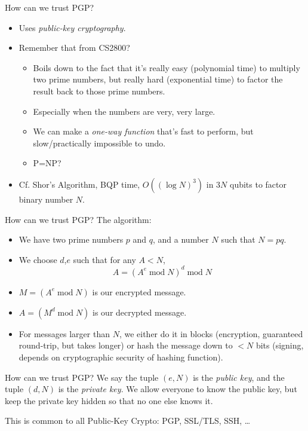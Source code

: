 \documentclass{beamer}
\begin{document}
\begin{frame}{How can we trust PGP?}
  \begin{itemize}
    \item Uses \textit{public-key cryptography}.
    \item Remember that from CS2800?
      \begin{itemize}
      \item Boils down to the fact that it's really easy (polynomial
        time) to multiply two prime numbers, but really hard
        (exponential time) to factor the result back to those prime
        numbers.
      \item Especially when the numbers are very, very large.
      \item We can make a \textit{one-way function} that's fast to
        perform, but slow/practically impossible to undo.
      \item P=NP?
      \end{itemize}
    \item Cf. Shor's Algorithm, BQP time, $O\left((\log N)^3\right)$
      in $3N$ qubits to factor binary number $N$.
  \end{itemize}
\end{frame}

\begin{frame}{How can we trust PGP?}
  The algorithm:
  \begin{itemize}
  \item We have two prime numbers $p$ and $q$, and a number $N$ such
    that $N=pq$.
  \item We choose $d$,$e$ such that for any $A<N$,
    \begin{equation*}
      A = (A^e\operatorname{mod}N)^d\operatorname{mod}N
    \end{equation*}
  \item $M=(A^e\operatorname{mod}N)$ is our encrypted message.
  \item $A=(M^d\operatorname{mod}N)$ is our decrypted message.
  \item For messages larger than $N$, we either do it in blocks
    (encryption, guaranteed round-trip, but takes longer) or hash the
    message down to $<N$ bits (signing, depends on cryptographic
    security of hashing function).
  \end{itemize}
\end{frame}

\begin{frame}{How can we trust PGP?}
  We say the tuple $(e,N)$ is the \textit{public key}, and the tuple
  $(d,N)$ is the \textit{private key}.  We allow everyone to know the
  public key, but keep the private key hidden so that no one else
  knows it.

  This is common to all Public-Key Crypto: PGP, SSL/TLS, SSH, \dots
\end{frame}
\end{document}
